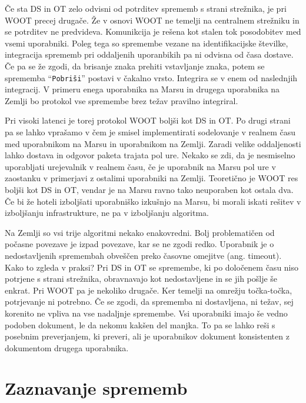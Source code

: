 \documentclass[a4paper, 12pt, twoside]{book}
\begin{document}
Če sta DS in OT zelo odvisni od potrditev sprememb s strani strežnika, je pri WOOT precej drugače. Že v osnovi WOOT ne temelji na centralnem strežniku in se potrditev ne predvideva. Komunikcija je rešena kot stalen tok posodobitev med vsemi uporabniki. Poleg tega so spremembe vezane na identifikacijske številke, integracija sprememb pri oddaljenih uporanbikih pa ni odvisna od časa dostave. Če pa se že zgodi, da brisanje znaka prehiti vstavljanje znaka, potem se sprememba “{\tt Pobriši}” postavi v čakalno vrsto. Integrira se v enem od naslednjih integracij. V primeru enega uporabnika na Marsu in drugega uporabnika na Zemlji bo protokol vse spremembe brez težav pravilno integriral.

Pri visoki latenci je torej protokol WOOT boljši kot DS in OT. Po drugi strani pa se lahko vprašamo v čem je smisel implementirati sodelovanje v realnem času med uporabnikom na Marsu in uporabnikom na Zemlji. Zaradi velike oddaljenosti lahko dostava in odgovor paketa trajata pol ure. Nekako se zdi, da je nesmiselno uporabljati urejevalnik v realnem času, če je uporabnik na Marsu pol ure v zaostanku v primerjavi z ostalimi uporabniki na Zemlji. Teoretično je WOOT res boljši kot DS in OT, vendar je na Marsu ravno tako neuporaben kot ostala dva. Če bi že hoteli izboljšati uporabniško izkušnjo na Marsu, bi morali iskati rešitev v izboljšanju infrastrukture, ne pa v izboljšanju algoritma.

Na Zemlji so vsi trije algoritmi nekako enakovredni. Bolj problematičen od počasne povezave je izpad povezave, kar se ne zgodi redko. Uporabnik je o nedostavljenih spremembah obveščen preko časovne omejitve (ang. timeout). Kako to zgleda v praksi? Pri DS in OT se spremembe, ki po določenem času niso potrjene s strani strežnika, obravnavajo kot nedostavljene in se jih pošlje še enkrat. Pri WOOT pa je nekoliko drugače. Ker temelji na omrežju točka-točka, potrjevanje ni potrebno. Če se zgodi, da sprememba ni dostavljena, ni težav, sej korenito ne vpliva na vse nadaljnje spremembe. Vsi uporabniki imajo še vedno podoben dokument, le da nekomu kakšen del manjka. To pa se lahko reši s posebnim preverjanjem, ki preveri, ali je uporabnikov dokument konsistenten z dokumentom drugega uporabnika.

\section{Zaznavanje sprememb}
\end{document}
